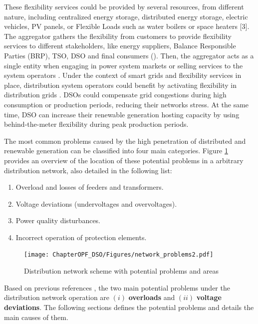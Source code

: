 These flexibility services could be provided by several resources, from different nature, including centralized energy storage, distributed energy storage, electric vehicles, PV panels, or Flexible Loads such as water boilers or space heaters [3]. The aggregator gathers the flexibility from customers to provide flexibility services to different stakeholders, like energy suppliers, Balance Responsible Parties (BRP), TSO, DSO and final consumers (\cite{USEFFoundation2015a, Olivella2018}). Then, the aggregator acts as a single entity when engaging in power system markets or selling services to the system operators \cite{BURGER2017}. Under the context of smart grids and flexibility services in place, distribution system operators could benefit by activating flexibility in distribution grids \cite{USEFFoundation2015a, spiliotis2016demand, esmat2016conf, hashemi2016}. DSOs could compensate grid congestions during high consumption or production periods, reducing their networks stress. At the same time, DSO can increase their renewable generation hosting capacity by using behind-the-meter flexibility during peak production periods. 

The most common problems caused by the high penetration of distributed and renewable generation can be classified into four main categories. Figure \ref{fig:network_problems} provides an overview of the location of these potential problems in a arbitrary distribution network, also detailed in the following list:  

\begin{enumerate}
\item Overload and losses of feeders and transformers. 
\item Voltage deviations (undervoltages and overvoltages).
\item Power quality disturbances.
\item Incorrect operation of protection elements. 
\end{enumerate}

\begin{figure}[h]
	\centering
	\texttt{[image: ChapterOPF\_DSO/Figures/network\_problems2.pdf]}
		\caption{Distribution network scheme with potential problems and areas}
	\label{fig:network_problems}  
\end{figure}

Based on previous references \cite{ISMAEL20191002, Bollen2011}, the two main potential problems under the distribution network operation are $(i)$ \textbf{overloads} and  $(ii)$ \textbf{voltage deviations}. The following sections defines the potential problems and details the main causes of them. 


